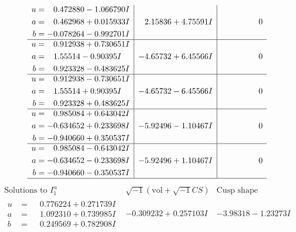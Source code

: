 \documentclass[1p]{elsarticle_modified}
\theoremstyle{definition}
\newcommand{\I}{\sqrt{-1}}
\begin{document}
$$\begin{array}{c|c|c}
\begin{aligned}
u &= \phantom{-}0.472880 - 1.066790 I \\
a &= \phantom{-}0.462968 + 0.015933 I \\
b &= -0.078264 - 0.992701 I\end{aligned}
 & \phantom{-}2.15836 + 4.75591 I & \phantom{-0.000000 } 0 \\ \hline\begin{aligned}
u &= \phantom{-}0.912938 + 0.730651 I \\
a &= \phantom{-}1.55514 - 0.90395 I \\
b &= \phantom{-}0.923328 - 0.483625 I\end{aligned}
 & -4.65732 + 6.45566 I & \phantom{-0.000000 } 0 \\ \hline\begin{aligned}
u &= \phantom{-}0.912938 - 0.730651 I \\
a &= \phantom{-}1.55514 + 0.90395 I \\
b &= \phantom{-}0.923328 + 0.483625 I\end{aligned}
 & -4.65732 - 6.45566 I & \phantom{-0.000000 } 0 \\ \hline\begin{aligned}
u &= \phantom{-}0.985084 + 0.643042 I \\
a &= -0.634652 + 0.233698 I \\
b &= -0.940660 + 0.350537 I\end{aligned}
 & -5.92496 - 1.10467 I & \phantom{-0.000000 } 0 \\ \hline\begin{aligned}
u &= \phantom{-}0.985084 - 0.643042 I \\
a &= -0.634652 - 0.233698 I \\
b &= -0.940660 - 0.350537 I\end{aligned}
 & -5.92496 + 1.10467 I & \phantom{-0.000000 } 0\\
 \hline 
 \end{array}$$\newpage$$\begin{array}{c|c|c}  
\text{Solutions to }I^u_{1}& \I (\text{vol} + \sqrt{-1}CS) & \text{Cusp shape}\\
 \hline 
\begin{aligned}
u &= \phantom{-}0.776224 + 0.271739 I \\
a &= \phantom{-}1.092310 + 0.739985 I \\
b &= \phantom{-}0.249569 + 0.782908 I\end{aligned}
 & -0.309232 + 0.257103 I & -3.98318 - 1.23273 I \\ \hline\begin{aligned}

\end{aligned}
\end{array}$$
\end{document}
